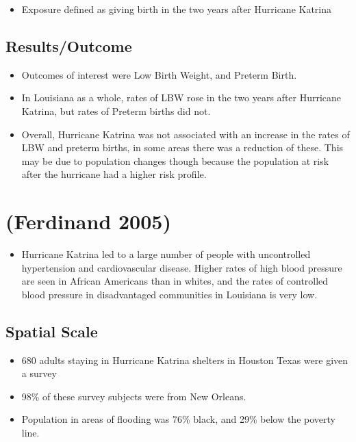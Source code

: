 \documentclass[
]{article}
\providecommand{\tightlist}{%
  \setlength{\itemsep}{0pt}\setlength{\parskip}{0pt}}
\begin{document}
\begin{itemize}
\tightlist
\item
  Exposure defined as giving birth in the two years after Hurricane
  Katrina
\end{itemize}

\hypertarget{resultsoutcome}{%
\subsection{Results/Outcome}\label{resultsoutcome}}

\begin{itemize}
\tightlist
\item
  Outcomes of interest were Low Birth Weight, and Preterm Birth.
\item
  In Louisiana as a whole, rates of LBW rose in the two years after
  Hurricane Katrina, but rates of Preterm births did not.
\item
  Overall, Hurricane Katrina was not associated with an increase in the
  rates of LBW and preterm births, in some areas there was a reduction
  of these. This may be due to population changes though because the
  population at risk after the hurricane had a higher risk profile.
\end{itemize}

\hypertarget{ferdinand2005hurricane}{%
\section{(Ferdinand 2005)}\label{ferdinand2005hurricane}}

\begin{itemize}
\tightlist
\item
  Hurricane Katrina led to a large number of people with uncontrolled
  hypertension and cardiovascular disease. Higher rates of high blood
  pressure are seen in African Americans than in whites, and the rates
  of controlled blood pressure in disadvantaged communities in Louisiana
  is very low.
\end{itemize}

\hypertarget{spatial-scale-10}{%
\subsection{Spatial Scale}\label{spatial-scale-10}}

\begin{itemize}
\tightlist
\item
  680 adults staying in Hurricane Katrina shelters in Houston Texas were
  given a survey
\item
  98\% of these survey subjects were from New Orleans.
\item
  Population in areas of flooding was 76\% black, and 29\% below the
  poverty line.
\end{itemize}
\end{document}
